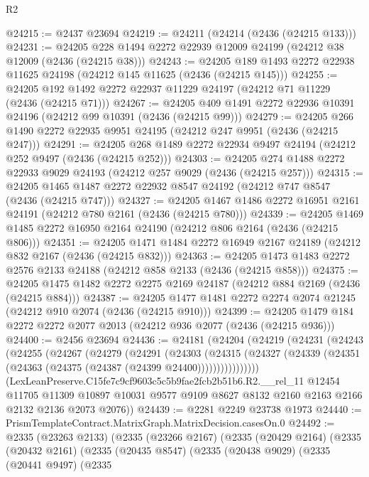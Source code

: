 \begin{lexlean}{R2}
\begin{coremodule}
@24215 := @2437 @23694
@24219 := @24211 (@24214 (@2436 (@24215 @133)))
@24231 := @24205 @228 @1494 @2272 @22939 @12009 @24199 (@24212 @38 @12009 (@2436 (@24215 @38)))
@24243 := @24205 @189 @1493 @2272 @22938 @11625 @24198 (@24212 @145 @11625 (@2436 (@24215 @145)))
@24255 := @24205 @192 @1492 @2272 @22937 @11229 @24197 (@24212 @71 @11229 (@2436 (@24215 @71)))
@24267 := @24205 @409 @1491 @2272 @22936 @10391 @24196 (@24212 @99 @10391 (@2436 (@24215 @99)))
@24279 := @24205 @266 @1490 @2272 @22935 @9951 @24195 (@24212 @247 @9951 (@2436 (@24215 @247)))
@24291 := @24205 @268 @1489 @2272 @22934 @9497 @24194 (@24212 @252 @9497 (@2436 (@24215 @252)))
@24303 := @24205 @274 @1488 @2272 @22933 @9029 @24193 (@24212 @257 @9029 (@2436 (@24215 @257)))
@24315 := @24205 @1465 @1487 @2272 @22932 @8547 @24192 (@24212 @747 @8547 (@2436 (@24215 @747)))
@24327 := @24205 @1467 @1486 @2272 @16951 @2161 @24191 (@24212 @780 @2161 (@2436 (@24215 @780)))
@24339 := @24205 @1469 @1485 @2272 @16950 @2164 @24190 (@24212 @806 @2164 (@2436 (@24215 @806)))
@24351 := @24205 @1471 @1484 @2272 @16949 @2167 @24189 (@24212 @832 @2167 (@2436 (@24215 @832)))
@24363 := @24205 @1473 @1483 @2272 @2576 @2133 @24188 (@24212 @858 @2133 (@2436 (@24215 @858)))
@24375 := @24205 @1475 @1482 @2272 @2275 @2169 @24187 (@24212 @884 @2169 (@2436 (@24215 @884)))
@24387 := @24205 @1477 @1481 @2272 @2274 @2074 @21245 (@24212 @910 @2074 (@2436 (@24215 @910)))
@24399 := @24205 @1479 @184 @2272 @2272 @2077 @2013 (@24212 @936 @2077 (@2436 (@24215 @936)))
@24400 := @2456 @23694
@24436 := @24181
    (@24204
      (@24219
        (@24231
          (@24243
            (@24255
              (@24267
                (@24279
                  (@24291
                    (@24303
                      (@24315
                        (@24327
                          (@24339 (@24351 (@24363 (@24375 (@24387 (@24399 @24400))))))))))))))))
      (LexLeanPreserve.C15fe7c9cf9603c5c5b9fae2fcb2b51b6.R2.__rel_11
        @12454
        @11705
        @11309
        @10897
        @10031
        @9577
        @9109
        @8627
        @8132
        @2160
        @2163
        @2166
        @2132
        @2136
        @2073
        @2076))
@24439 := @2281 @2249 @23738 @1973
@24440 := PrismTemplateContract.MatrixGraph.MatrixDecision.casesOn.{0}
@24492 := @2335
    (@23263 @2133)
    (@2335
      (@23266 @2167)
      (@2335
        (@20429 @2164)
        (@2335
          (@20432 @2161)
          (@2335
            (@20435 @8547)
            (@2335
              (@20438 @9029)
              (@2335
                (@20441 @9497)
                (@2335

\end{coremodule}
\end{lexlean}
